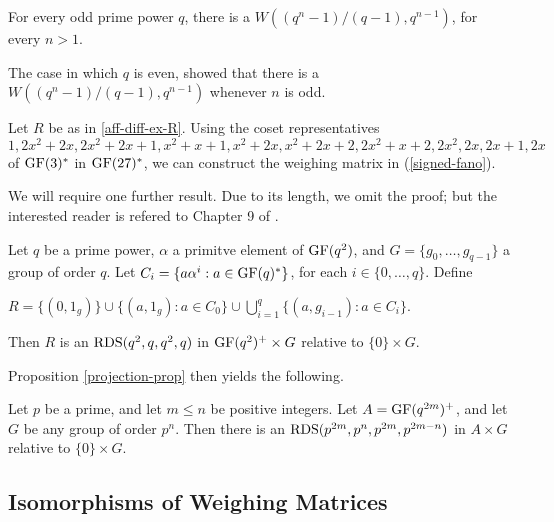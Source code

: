 \documentclass[../../../main]{subfiles}
\begin{document}
 \begin{cor}
  For every odd prime power $q$, there is a $W((q^n-1)/(q-1),q^{n-1})$, for every $n>1$.
 \end{cor}
 
 The case in which $q$ is even, \cite{even-prime-power-diff-sets} showed that there is a $W((q^n-1)/(q-1),q^{n-1})$ whenever $n$ is odd.
 
 \begin{ex}
  Let $R$ be as in \ref{aff-diff-ex-R}. Using the coset representatives $1, 2x^2 + 2x, 2x^2 + 2x + 1, x^2 + x + 1, x^2 + 2x, x^2 + 2x + 2, 2x^2 + x + 2, 2x^2, 2x, 2x + 1, 2x$ of $\text{GF}(3)^*$ in $\text{GF}(27)^*$, we can construct the weighing matrix in (\ref{signed-fano}).
 \end{ex}
 
 We will require one further result. Due to its length, we omit the proof; but the interested reader is refered to Chapter 9 of \cite{combinatorics-of-symmetric-designs}.
 
 \begin{prop}
  Let $q$ be a prime power, $\alpha$ a primitve element of $\text{GF}(q^2)$, and $G=\{g_0, \dots, g_{q-1}\}$ a group of order $q$. Let $C_i=\{a\alpha^i : a \in \text{GF}(q)^*\}$, for each $i \in \{0,\dots,q\}$. Define
  \begin{defenum}
   \item\label{p-group-diff} $R = \{(0,1_g)\} \cup \{(a,1_g) : a \in C_0\} \cup \bigcup_{i=1}^q \{(a,g_{i-1}) : a \in C_i\}$.
  \end{defenum}
  Then $R$ is an $\text{RDS}(q^2,q,q^2,q)$ in $\text{GF}(q^2)^+ \times G$ relative to $\{0\} \times G$.
 \end{prop}
 
 Proposition \ref{projection-prop} then yields the following.
 
 \begin{cor}
  Let $p$ be a prime, and let $m \leq n$ be positive integers. Let $A=\text{GF}(q^{2m})^+$, and let $G$ be any group of order $p^n$. Then there is an $\text{RDS}(p^{2m},p^n,p^{2m},p^{2m-n})$ in $A \times G$ relative to $\{0\} \times G$.
 \end{cor}
 
 \dinkus
 
 \subsection{Isomorphisms of Weighing Matrices}
 
\end{document}

